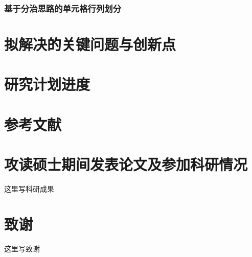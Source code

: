 \documentclass[UTF8,12pt, AutoFakeBold,fontset = founder]{ctexart}
\begin{document}
\subsubsection{基于分治思路的单元格行列划分}

\section{拟解决的关键问题与创新点}

\section{研究计划进度}

\clearpage
{} %
\section*{参考文献}


\clearpage
{} %
\section*{攻读硕士期间发表论文及参加科研情况}
这里写科研成果

\clearpage
{} %
\section*{致谢}
这里写致谢
\end{document}
